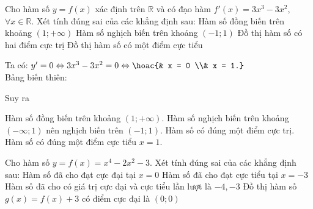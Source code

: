 \begin{ex}
 Cho hàm số $y = f(x)$ xác định trên $\mathbb{R}$ và có đạo hàm $f'(x) = 3x^3 - 3x^2$, $\forall x\in \mathbb{R}$. Xét tính đúng sai của các khẳng định sau:
 \choiceTF
 {\True Hàm số đồng biến trên khoảng $(1;+\infty)$}
 {\True Hàm số nghịch biến trên khoảng $(-1;1)$}
 {Đồ thị hàm số có hai điểm cực trị}
 {\True Đồ thị hàm số có một điểm cực tiểu}
 \loigiai
 {
 Ta có: $y' = 0 \Leftrightarrow 3x^3 - 3x^2 = 0 \Leftrightarrow \hoac{& x = 0 \\& x = 1.}$\\
 Bảng biến thiên:
 \begin{center}
 \end{center}
 Suy ra
 \begin{itemchoice}
 \itemch Hàm số đồng biến trên khoảng $(1;+\infty)$.
 \itemch Hàm số nghịch biến trên khoảng $(-\infty;1)$ nên nghịch biến trên $(-1;1)$.
 \itemch Hàm số có đúng một điểm cực trị.
 \itemch Hàm số có đúng một điểm cực tiểu $x = 1$.
 \end{itemchoice}
 }
\end{ex}
\begin{ex}%
 Cho hàm số $y=f(x)=x^4-2x^2-3$. Xét tính đúng sai của các khẳng định sau:
 \choiceTF
 {\True Hàm số đã cho đạt cực đại tại $x=0$}
 {Hàm số đã cho đạt cực tiểu tại $x=-3$}
 {Hàm số đã cho có giá trị cực đại và cực tiểu lần lượt là $-4,-3$}
 {Đồ thị hàm số $g(x)=f(x)+3$ có điểm cực đại là $(0;0)$ }
\end{ex}
